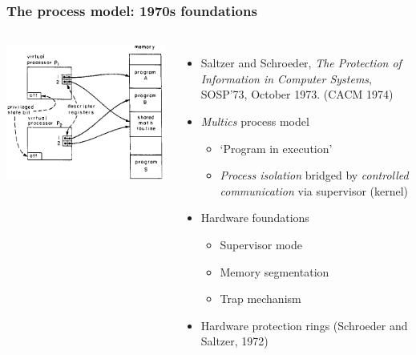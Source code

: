 \begin{frame}
  \frametitle{The process model: 1970s foundations}
  \begin{columns}[T]
      \vspace{1.25cm}
      \includegraphics[width=1.1\textwidth]{../../figures/saltzer-schroeder-protection.png}

      \begin{itemize}
	\item Saltzer and Schroeder, \textit{The Protection of Information in
	  Computer Systems}, SOSP'73, October 1973.
	  (CACM 1974)

	\pause

	\item \textit{Multics} process model
	\begin{itemize}
	  \item `Program in execution'
	  \item \textit{Process isolation} bridged by \textit{controlled
	  communication} via supervisor (kernel)
	\end{itemize}

	\pause

	\item Hardware foundations
	\begin{itemize}
	  \item Supervisor mode
	  \item Memory segmentation
	  \item Trap mechanism
	\end{itemize}

	\pause

	\item Hardware protection rings (Schroeder and Saltzer, 1972)
      \end{itemize}
  \end{columns}
\end{frame}

